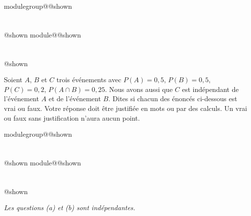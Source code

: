\documentclass{Evaluation}
\makeatletter
\newcommand{\currentmodulekey}{}
\newcommand{\currentmoduletitle}{}
\newcommand{\currentgroupkey}{}
\newcommand{\currentgrouptitle}{}
\newcommand{\showmoduleifneeded}{%
  \ifx\currentgroupkey\empty\else
    \expandafter\ifx\csname modulegroup@\currentgroupkey @shown\endcsname\relax
      \section*{\currentgrouptitle}%
      \expandafter\gdef\csname modulegroup@\currentgroupkey @shown\endcsname{1}%
    \fi
  \fi
  \expandafter\ifx\csname module@\currentmodulekey @shown\endcsname\relax
    \section*{\currentmoduletitle}%
    \expandafter\gdef\csname module@\currentmodulekey @shown\endcsname{1}%
  \fi
}
\newenvironment{A23}{\showmoduleifneeded}{}
\newenvironment{A24}{\showmoduleifneeded}{}
\makeatother
\begin{document}
\begin{questions}
\begin{A23}
\question {} %
\label{A23-I5-pa} Soient $A$, $B$ et $C$ trois événements avec $P(A)=0,5$, $P(B)=0,5$, $P(C)=0,2$, $P(A\cap B)=0,25$. Nous avons aussi que $C$ est indépendant de l'événement $A$ et de l'événement $B$. Dites si chacun des énoncés ci-dessous est vrai ou faux. Votre réponse doit être justifiée en mots ou par des calculs. Un vrai ou faux sans justification n'aura aucun point.


\end{A23}

\begin{A24}
\question {} %
\label{A24-I1-module1_1} \textit{Les questions (a) et (b) sont indépendantes.}
\begin{parts}

\end{parts}
\end{A24}
\end{questions}
\end{document}
